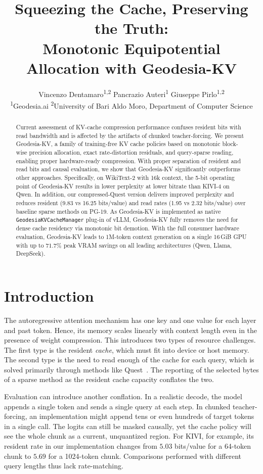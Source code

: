 \documentclass[10pt,twocolumn]{article}
\title{\vspace{-1.2cm}\textbf{Squeezing the Cache, Preserving the Truth:\\Monotonic Equipotential Allocation with Geodesia-KV}}
\author{
Vincenzo Dentamaro\textsuperscript{1,2} \qquad
Pancrazio Auteri\textsuperscript{1} \qquad
Giuseppe Pirlo\textsuperscript{1,2} \\[1ex]
\small \textsuperscript{1}Geodesia.ai \qquad
\textsuperscript{2}University of Bari Aldo Moro, Department of Computer Science
}
\date{}
\newcommand{\method}{Geodesia-KV}
\newcommand{\bpv}{bits/value}
\newcommand{\wikitext}{WikiText-2}
\newcommand{\pg}{PG-19}
\begin{document}
\maketitle
\begin{abstract}
\noindent
Current assessment of KV-cache compression performance confuses resident bits with read bandwidth and is affected by the artifacts of chunked teacher-forcing. We present \method{}, a family of training-free KV cache policies based on monotonic block-wise precision allocation, exact rate-distortion residuals, and query-sparse reading, enabling proper hardware-ready compression. With proper separation of resident and read bits and causal evaluation, we show that \method{} significantly outperforms other approaches. Specifically, on \wikitext{} with 16k context, the 5-bit operating point of \method{} results in lower perplexity at lower bitrate than KIVI-4 on Qwen. In addition, our compressed-Quest version delivers improved perplexity and reduces resident (9.83 vs 16.25 \bpv{}) and read rates (1.95 vs 2.32 \bpv{}) over baseline sparse methods on \pg{}. As \method{} is implemented as native \texttt{GeodesiaKVCacheManager} plug-in of vLLM, \method{} fully removes the need for dense cache residency via monotonic bit demotion. With the full consumer hardware evaluation, \method{} leads to 1M-token context generation on a single 16\,GiB GPU with up to $71.7\%$ peak VRAM savings on all leading architectures (Qwen, Llama, DeepSeek).
\end{abstract}
\section{Introduction}

The autoregressive attention mechanism has one key and one value for each
layer and past token. Hence, its memory scales linearly with context length
even in the presence of weight compression. This introduces two types of resource challenges. The first type is the resident \emph{cache},
which must fit into device or host memory. The second type is the need to
read enough of the cache for each query, which is solved primarily through
methods like Quest~\cite{tang2024quest}. The reporting of the selected bytes
of a sparse method as the resident cache capacity conflates the two.

Evaluation can introduce another conflation. In a realistic decode, the
model appends a single token and sends a single query at each step. In chunked
teacher-forcing, an implementation might append tens or even hundreds of
target tokens in a single call. The logits can still be masked causally, yet
the cache policy will see the whole chunk as a current, unquantized region.
For KIVI, for example, its resident rate in our implementation changes from
$5.03$ \bpv{} for a 64-token chunk to $5.69$ for a 1024-token chunk. Comparisons performed
with different query lengths thus lack rate-matching.
\end{document}

